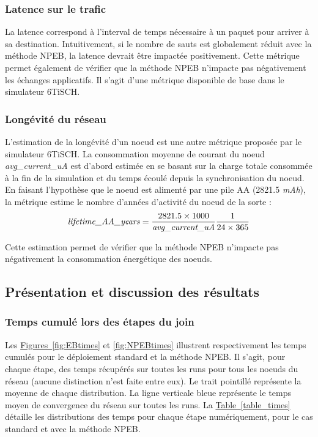 \documentclass[]{report}
\newcommand{\wordlink}[2]{\hyperref[#2]{#1~\ref{#2}}}
\begin{document}
\subsubsection{Latence sur le trafic}

La latence correspond à l'interval de temps nécessaire à un paquet pour arriver à sa destination. Intuitivement, si le nombre de sauts est globalement réduit avec la méthode NPEB, la latence devrait être impactée positivement. Cette métrique permet également de vérifier que la méthode NPEB n'impacte pas négativement les échanges applicatifs. Il s'agit d'une métrique disponible de base dans le simulateur 6TiSCH.

\subsubsection{Longévité du réseau}
\label{metric_lifetime}

L'estimation de la longévité d'un noeud est une autre métrique proposée par le simulateur 6TiSCH. La consommation moyenne de courant du noeud \textit{avg\_current\_uA} est d'abord estimée en se basant sur la charge totale consommée à la fin de la simulation et du temps écoulé depuis la synchronisation du noeud. En faisant l'hypothèse que le noeud est alimenté par une pile AA (2821.5 \textit{mAh}), la métrique estime le nombre d'années d'activité du noeud de la sorte :
\[
\text{\textit{lifetime\_AA\_years}} = \frac{2821.5 \times 1000}{\text{\textit{avg\_current\_uA}}}
\frac{1}{24 \times 365}
\]

Cette estimation permet de vérifier que la méthode NPEB n'impacte pas négativement la consommation énergétique des noeuds.

\subsection{Présentation et discussion des résultats}

\subsubsection{Temps cumulé lors des étapes du join}
\label{results_times}

Les \wordlink{Figures}{fig:EBtimes} et \ref{fig:NPEBtimes} illustrent respectivement les temps cumulés pour le déploiement standard et la méthode NPEB. Il s'agit, pour chaque étape, des temps récupérés sur toutes les runs pour tous les noeuds du réseau (aucune distinction n'est faite entre eux). Le trait pointillé représente la moyenne de chaque distribution. La ligne verticale bleue représente le temps moyen de convergence du réseau sur toutes les runs. La \wordlink{Table}{table_times} détaille les distributions des temps pour chaque étape numériquement, pour le cas standard et avec la méthode NPEB.
\end{document}

